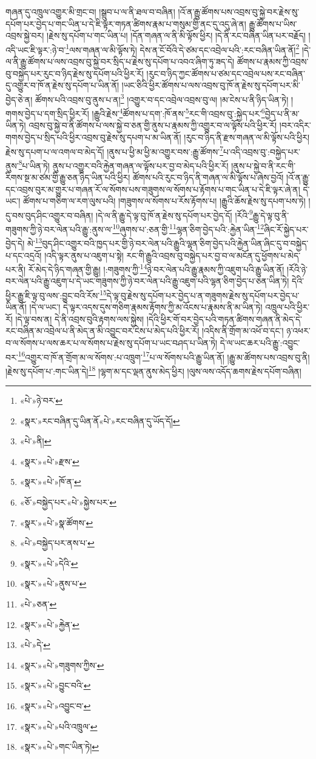 གཞན་དུ་འཁྲུལ་འགྱུར་མི་གྲང་བ། །སྒྲུབ་པ་ལ་ནི་ཐལ་བ་བཞིན། །འོ་ན་རྒྱུ་ཚོགས་པས་འབྲས་བུ་སྐྱེ་བར་རྗེས་སུ་དཔོག་པར་བྱེད་པ་གང་ཡིན་པ་དེ་ཇི་ལྟར་གཏན་ཚིགས་རྣམ་པ་གསུམ་གྱི་ནང་དུ་འདུ་ཞེ་ན། རྒྱུ་ཚོགས་པ་ཡིས་འབྲས་སྐྱེ་བར། །རྗེས་སུ་དཔོག་པ་གང་ཡིན་པ། །དོན་གཞན་ལ་ནི་མི་ལྟོས་ཕྱིར། །དེ་ནི་རང་བཞིན་ཡིན་པར་བརྗོད། །འདི་ཡང་ཇི་ལྟར་:ཉེ་བ་\footnote{«པེ་»ཉེ་བར་}ལས་གཞན་ལ་མི་ལྟོས་ཏེ། དེས་ན་ངོ་བོའི་དེ་ཙམ་དང་འབྲེལ་པའི་:རང་བཞིན་ཡིན་ནོ།\footnote{«སྣར་»རང་བཞིན་དུ་ཡིན་ནོ«པེ་»རང་བཞིན་དུ་ཡོད་དོ།} །དེ་ལ་ནི་རྒྱུ་ཚོགས་པ་ལས་འབྲས་བུ་སྐྱེ་བར་སྲིད་པ་རྗེས་སུ་དཔོག་པ་འབའ་ཞིག་ཏུ་ཟད་དེ། ཚོགས་པ་རྣམས་ཀྱི་འབྲས་བུ་བསྐྱེད་པར་རུང་བ་ཉིད་རྗེས་སུ་དཔོག་པའི་ཕྱིར་རོ། །རུང་བ་ཉིད་ཀྱང་ཚོགས་པ་ཙམ་དང་འབྲེལ་པས་རང་བཞིན་དུ་འགྱུར་བ་ཁོ་ན་རྗེས་སུ་དཔོག་པ་ཡིན་ནོ། །ཡང་ཅིའི་ཕྱིར་ཚོགས་པ་ལས་འབྲས་བུ་ཁོ་ན་རྗེས་སུ་དཔོག་པར་མི་བྱེད་ཅེ་ན། ཚོགས་པའི་འབྲས་བུ་ནུས་པ་ན།\footnote{«པེ་»ནི།} །འགྱུར་བ་དང་འབྲེལ་འབྲས་བུ་ལ། །མ་ངེས་པ་ནི་ཉིད་ཡིན་ཏེ། །གགས་བྱེད་པ་དག་སྲིད་ཕྱིར་རོ། །རྒྱུའི་རྗེས་\footnote{«སྣར་»«པེ་»རྫས་}ཚོགས་པ་དག་:ཁོ་ནས་\footnote{«སྣར་»«པེ་»ཁོ་ན་}རང་གི་འབྲས་བུ་:སྐྱེད་པར་\footnote{«ཅོ་»བསྐྱེད་པར་«པེ་»སྐྱེས་པར་}བྱེད་པ་ནི་མ་ཡིན་ཏེ། འབྲས་བུ་སྐྱེ་བ་ནི་ཚོགས་པ་ལས་སྐྱེ་བ་ཅན་གྱི་ནུས་པ་རྣམས་ཀྱི་འགྱུར་བ་ལ་ལྟོས་པའི་ཕྱིར་རོ། །བར་འདིར་གགས་བྱེད་པ་སྲིད་པའི་ཕྱིར་འབྲས་བུ་རྗེས་སུ་དཔག་པ་མ་ཡིན་ནོ། །རུང་བ་ཉིད་ནི་རྫས་གཞན་ལ་མི་ལྟོས་པའི་ཕྱིར། རྗེས་སུ་དཔག་པ་ལ་འགལ་བ་མེད་དོ། །ནུས་པ་ཕྱི་མ་ཕྱི་མ་འགྱུར་བས་:རྒྱུ་ཚོགས་\footnote{«སྣར་»«པེ་»སྣ་ཚོགས་}པ་འདི་འབྲས་བུ་:བསྐྱེད་པར་ནུས་\footnote{«པེ་»བསྐྱེད་པར་ནས་པ་}པ་ཡིན་ཏེ། ནུས་པ་འགྱུར་བའི་རྐྱེན་གཞན་ལ་ལྟོས་པར་བྱ་བ་མེད་པའི་ཕྱིར་རོ། །ནུས་པ་སྐྱེ་བ་ནི་རང་གི་རིགས་སྔ་མ་ཙམ་གྱི་རྒྱུ་ཅན་ཉིད་ཡིན་པའི་ཕྱིར། ཚོགས་པའི་རུང་བ་ཉིད་ནི་གཞན་ལ་མི་ལྟོས་པ་ཞེས་བྱའོ། །འོ་ན་རྒྱུ་དང་འབྲས་བུར་མ་གྱུར་པ་གཞན་རོ་ལ་སོགས་པས་གཟུགས་ལ་སོགས་པ་རྟོགས་པ་གང་ཡིན་པ་དེ་ཇི་ལྟར་ཞེ་ན། དེ་ཡང་། ཚོགས་པ་གཅིག་ལ་རག་ལུས་པའི། །གཟུགས་ལ་སོགས་པ་རོས་རྟོགས་པ། །རྒྱུའི་ཆོས་རྗེས་སུ་དཔག་པས་ཏེ། །དུ་བས་བུད་ཤིང་འགྱུར་བ་བཞིན། །དེ་ལ་ནི་རྒྱུ་དེ་ལྟ་བུ་ཁོ་ན་རྗེས་སུ་དཔོག་པར་བྱེད་དོ། །རོའི་\footnote{«སྣར་»«པེ་»དེའི་}རྒྱུ་དེ་ལྟ་བུ་ནི་གཟུགས་ཀྱི་ཉེ་བར་ལེན་པའི་རྒྱུ་:ནུས་ལ་\footnote{«སྣར་»«པེ་»ནུས་པ་}ཞུགས་པ་:ཅན་གྱི་\footnote{«པེ་»ཅན་}ལྷན་ཅིག་བྱེད་པའི་:རྐྱེན་ཡིན་\footnote{«སྣར་»«པེ་»རྐྱེན་}ཞིང་རོ་སྐྱེད་པར་བྱེད་དེ། མེ་\footnote{«པེ་»དེ་}བུད་ཤིང་འགྱུར་བའི་ཁྱད་པར་གྱི་ཉེ་བར་ལེན་པའི་རྒྱུའི་ལྷན་ཅིག་བྱེད་པའི་རྐྱེན་ཡིན་ཞིང་དུ་བ་བསྐྱེད་པ་དང་འདྲའོ། །འདི་ལྟར་ནུས་པ་འཇུག་པ་སྟེ། རང་གི་རྒྱུའི་འབྲས་བུ་བསྐྱེད་པར་བྱ་བ་ལ་མངོན་དུ་ཕྱོགས་པ་མེད་པར་ནི། རོ་མེད་དེ་ཉིད་གཞན་གྱི་རྒྱུ། །:གཟུགས་ཀྱི་\footnote{«སྣར་»«པེ་»གཟུགས་ཀྱིས་}ཉེ་བར་ལེན་པའི་རྒྱུ་རྣམས་ཀྱི་འཇུག་པའི་རྒྱུ་ཡིན་ནོ། །རོའི་ཉེ་བར་ལེན་པའི་རྒྱུ་འཇུག་པ་དེ་ཡང་གཟུགས་ཀྱི་ཉེ་བར་ལེན་པའི་རྒྱུ་འཇུག་པའི་ལྷན་ཅིག་བྱེད་པ་ཅན་ཡིན་ཏེ། དེའི་ཕྱིར་རྒྱུ་ཇི་ལྟ་བུ་ལས་:བྱུང་བའི་རོས་\footnote{«སྣར་»«པེ་»བྱུང་བའི་}དེ་ལྟ་བུ་རྗེས་སུ་དཔོག་པར་བྱེད་པ་ན་གཟུགས་རྗེས་སུ་དཔོག་པར་བྱེད་པ་ཡིན་ནོ། །དེ་ལ་ཡང་། དེ་ལྟར་འདས་དུས་གཅིག་རྣམས་རྟོགས་ཀྱི་མ་འོངས་པ་རྣམས་ནི་མ་ཡིན་ཏེ། འཁྲུལ་པའི་ཕྱིར་རོ། །དེ་ལྟ་བས་ན། དེ་ནི་འབྲས་བུའི་རྟགས་ལས་སྐྱེས། །དེའི་ཕྱིར་གོ་བར་བྱེད་པའི་གཏན་ཚིགས་གཞན་ནི་མེད་དེ་རང་བཞིན་མ་འབྲེལ་པ་ནི་མེད་ན་མི་འབྱུང་བར་ངེས་པ་མེད་པའི་ཕྱིར་རོ། །འདིས་ནི་གྲོག་མ་འཕོ་བ་དང་། ཉ་འཕར་བ་ལ་སོགས་པ་ལས་ཆར་པ་ལ་སོགས་པ་རྗེས་སུ་དཔོག་པ་ཡང་བཤད་པ་ཡིན་ཏེ། དེ་ལ་ཡང་ཆར་པའི་རྒྱུ་:འབྱུང་བར་\footnote{«སྣར་»«པེ་»འབྱུང་བ་}འགྱུར་བ་ཁོ་ན་གྲོག་མ་ལ་སོགས་:པ་འཁྲུག་\footnote{«སྣར་»«པེ་»པའི་འཁྲུལ་}པ་ལ་སོགས་པའི་རྒྱུ་ཡིན་ནོ། །རྒྱུ་མ་ཚོགས་པས་འབྲས་བུ་ནི། །རྗེས་སུ་དཔོག་པ་:གང་ཡིན་དེ།\footnote{«སྣར་»«པེ་»གང་ཡིན་ཏེ།} །ལྷག་མ་དང་ལྡན་ནུས་མེད་ཕྱིར། །ལུས་ལས་འདོད་ཆགས་རྗེས་དཔོག་བཞིན། 